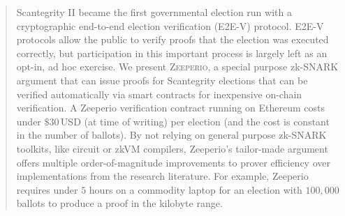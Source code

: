 \begin{abstract}

Scantegrity II became the first governmental election run with a cryptographic end-to-end election verification (E2E-V) protocol. 
E2E-V protocols allow the public to verify proofs that the election was executed correctly, but participation in this important process is largely left as an opt-in, ad hoc exercise. 
We present \textsc{Zeeperio}, a special purpose zk-SNARK argument that can issue proofs for Scantegrity elections that can be verified automatically via smart contracts for inexpensive on-chain verification.
A Zeeperio verification contract running on Ethereum costs under $\$30\,$USD (at time of writing) per election (and the cost is constant in the number of ballots).
By not relying on general purpose zk-SNARK toolkits, like circuit or zkVM compilers, Zeeperio's tailor-made argument offers multiple order-of-magnitude improvements to prover efficiency over implementations from the research literature. For example, Zeeperio requires under $5$ hours on a commodity laptop for an election with $100{,}000$ ballots to produce a proof in the kilobyte range. 







\end{abstract}